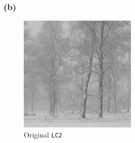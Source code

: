 \documentclass{article}
\begin{document}
\subsubsection*{(b)}

\begin{figure}[!htb]
    \centering
    \includegraphics[width = 0.5\textwidth]{LC2.jpg}
    \caption{Original \texttt{LC2}}
\end{figure}
\end{document}
